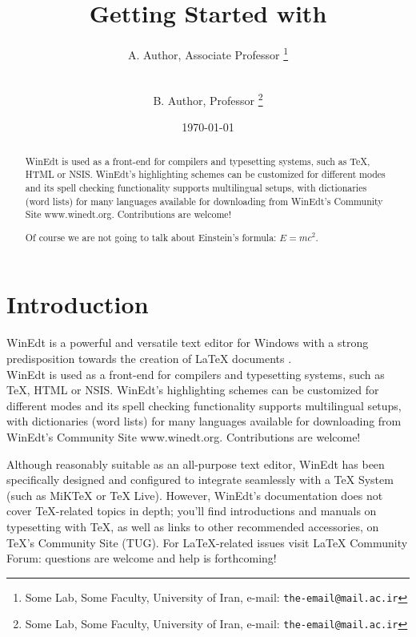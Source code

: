 \documentclass[11pt,a4paper]{article}
\begin{document}
\title{Getting Started with \LaTeXe{}}

\author{A. Author, Associate Professor
\thanks{Some Lab, Some Faculty, University of Iran, e-mail: \texttt{the-email@mail.ac.ir}}\\\\
\and B. Author, Professor
\thanks{Some Lab, Some Faculty, University of Iran, e-mail: \texttt{the-email@mail.ac.ir}}\\
}

\date{\today}

\maketitle

\begin{abstract}

WinEdt is used as a front-end for compilers and typesetting systems, such as TeX, HTML or NSIS. WinEdt's highlighting schemes can be customized for different modes and its spell checking functionality supports multilingual setups, with dictionaries (word lists) for many languages available for downloading from WinEdt's Community Site www.winedt.org. Contributions are welcome!

Of course we are not going to talk about Einstein's formula: $E = m c^2$.

\end{abstract}

\section{Introduction} \label{section.intro}

WinEdt is a powerful and versatile text editor\cite{Markovski09} for Windows with a strong predisposition towards the creation of LaTeX documents \cite{Green95,Markovski09,Tierney94}. \\[8pt]
WinEdt is used as a front-end for compilers and typesetting systems, such as TeX, HTML or NSIS. WinEdt's highlighting\cite{Markovski09,Tierney94} schemes can be customized for different modes and its spell checking functionality supports multilingual setups, with dictionaries (word lists) for many languages available for downloading from WinEdt's Community Site www.winedt.org. Contributions are welcome!

Although reasonably suitable\cite{Green95} as an all-purpose text editor, WinEdt has been specifically designed and configured to integrate seamlessly with a TeX System (such as MiKTeX or TeX Live). However, WinEdt's documentation does not cover TeX-related topics in depth; you'll find introductions and manuals on typesetting with TeX\cite{Green95,Markovski09}, as well as links to other recommended accessories, on TeX's Community Site (TUG). For LaTeX-related issues visit LaTeX Community Forum: questions are welcome and help is forthcoming!
\end{document}
